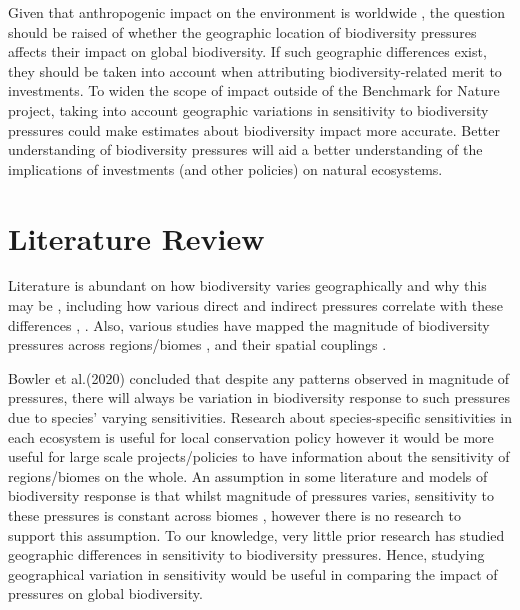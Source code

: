 \documentclass[11pt, a4paper, titlepage]{article}
\begin{document}
   	 Given that anthropogenic impact on the environment is worldwide \citep{plumptre2021might}, the question should be raised of whether the geographic location of biodiversity pressures affects their impact on global biodiversity. If such geographic differences exist, they should be taken into account when attributing biodiversity-related merit to investments. To widen the scope of impact outside of the Benchmark for Nature project, taking into account geographic variations in sensitivity to biodiversity pressures could make estimates about biodiversity impact more accurate. Better understanding of biodiversity pressures will aid a better understanding of the implications of investments (and other policies) on natural ecosystems. \newline
   	
   	\newpage
   	\section*{Literature Review}
   	
   	Literature is abundant on how biodiversity varies geographically and why this may be \citep{gaston2000global} \citep{ricklefs2004comprehensive} \citep{mcrae2017diversity}, including how various direct and indirect pressures correlate with these differences \citep{sunday2015species}, \citep{ament2019compatibility} \citep{Velde2022}. 
	Also, various studies have mapped the magnitude of biodiversity pressures across regions/biomes \citep{millennium2005ecosystems} \citep{sala2000global}, and their spatial couplings \citep{bowler2020mapping}. \newline
	
	Bowler et al.(2020) concluded that despite any patterns observed in magnitude of pressures, there will always be variation in biodiversity response to such pressures due to species' varying sensitivities. Research about species-specific sensitivities in each ecosystem is useful for local conservation policy however it would be more useful for large scale projects/policies to have information about the sensitivity of regions/biomes on the whole. An assumption in some literature and models of biodiversity response is that whilst magnitude of pressures varies, sensitivity to these pressures is constant across biomes \citep{sala2000global}, however there is no research to support this assumption. To our knowledge, very little prior research has studied geographic differences in sensitivity to biodiversity pressures. Hence, studying geographical variation in  sensitivity would be useful in comparing the impact of pressures on global biodiversity.  \newline
	
\end{document}
